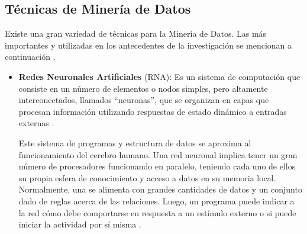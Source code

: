 \subsection{Técnicas de Minería de Datos}
Existe una gran variedad de técnicas para la Minería de Datos. Las más importantes y utilizadas en los antecedentes de la investigación se mencionan a continuación \parencite{gl_microsoft2018datamining}.

\begin{itemize}
	\item \textbf{Redes Neuronales Artificiales} (RNA): Es un sistema de computación que consiste en un número de elementos o nodos simples, pero altamente interconectados, llamados “neuronas”, que se organizan en capas que procesan información utilizando respuestas de estado dinámico a entradas externas \parencite{tec_inzaugarat2018ann}.
	
	Este sistema de programas y estructura de datos se aproxima al funcionamiento del cerebro humano. Una red neuronal implica tener un gran número de procesadores funcionando en paralelo, teniendo cada uno de ellos su propia esfera de conocimiento y acceso a datos en su memoria local. Normalmente, una se alimenta con grandes cantidades de datos y un conjunto dado de reglas acerca de las relaciones. Luego, un programa puede indicar a la red cómo debe comportarse en respuesta a un estímulo externo o si puede iniciar la actividad por sí misma \parencite{tec_banafa2019deeplearning}.
	

\end{itemize}
